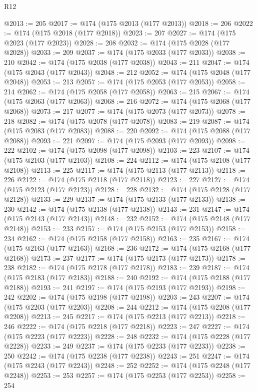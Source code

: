 \begin{lexlean}{R12}
\begin{coremodule}
@2013 := 205
@2017 := @174 (@175 @2013 (@177 @2013))
@2018 := 206
@2022 := @174 (@175 @2018 (@177 @2018))
@2023 := 207
@2027 := @174 (@175 @2023 (@177 @2023))
@2028 := 208
@2032 := @174 (@175 @2028 (@177 @2028))
@2033 := 209
@2037 := @174 (@175 @2033 (@177 @2033))
@2038 := 210
@2042 := @174 (@175 @2038 (@177 @2038))
@2043 := 211
@2047 := @174 (@175 @2043 (@177 @2043))
@2048 := 212
@2052 := @174 (@175 @2048 (@177 @2048))
@2053 := 213
@2057 := @174 (@175 @2053 (@177 @2053))
@2058 := 214
@2062 := @174 (@175 @2058 (@177 @2058))
@2063 := 215
@2067 := @174 (@175 @2063 (@177 @2063))
@2068 := 216
@2072 := @174 (@175 @2068 (@177 @2068))
@2073 := 217
@2077 := @174 (@175 @2073 (@177 @2073))
@2078 := 218
@2082 := @174 (@175 @2078 (@177 @2078))
@2083 := 219
@2087 := @174 (@175 @2083 (@177 @2083))
@2088 := 220
@2092 := @174 (@175 @2088 (@177 @2088))
@2093 := 221
@2097 := @174 (@175 @2093 (@177 @2093))
@2098 := 222
@2102 := @174 (@175 @2098 (@177 @2098))
@2103 := 223
@2107 := @174 (@175 @2103 (@177 @2103))
@2108 := 224
@2112 := @174 (@175 @2108 (@177 @2108))
@2113 := 225
@2117 := @174 (@175 @2113 (@177 @2113))
@2118 := 226
@2122 := @174 (@175 @2118 (@177 @2118))
@2123 := 227
@2127 := @174 (@175 @2123 (@177 @2123))
@2128 := 228
@2132 := @174 (@175 @2128 (@177 @2128))
@2133 := 229
@2137 := @174 (@175 @2133 (@177 @2133))
@2138 := 230
@2142 := @174 (@175 @2138 (@177 @2138))
@2143 := 231
@2147 := @174 (@175 @2143 (@177 @2143))
@2148 := 232
@2152 := @174 (@175 @2148 (@177 @2148))
@2153 := 233
@2157 := @174 (@175 @2153 (@177 @2153))
@2158 := 234
@2162 := @174 (@175 @2158 (@177 @2158))
@2163 := 235
@2167 := @174 (@175 @2163 (@177 @2163))
@2168 := 236
@2172 := @174 (@175 @2168 (@177 @2168))
@2173 := 237
@2177 := @174 (@175 @2173 (@177 @2173))
@2178 := 238
@2182 := @174 (@175 @2178 (@177 @2178))
@2183 := 239
@2187 := @174 (@175 @2183 (@177 @2183))
@2188 := 240
@2192 := @174 (@175 @2188 (@177 @2188))
@2193 := 241
@2197 := @174 (@175 @2193 (@177 @2193))
@2198 := 242
@2202 := @174 (@175 @2198 (@177 @2198))
@2203 := 243
@2207 := @174 (@175 @2203 (@177 @2203))
@2208 := 244
@2212 := @174 (@175 @2208 (@177 @2208))
@2213 := 245
@2217 := @174 (@175 @2213 (@177 @2213))
@2218 := 246
@2222 := @174 (@175 @2218 (@177 @2218))
@2223 := 247
@2227 := @174 (@175 @2223 (@177 @2223))
@2228 := 248
@2232 := @174 (@175 @2228 (@177 @2228))
@2233 := 249
@2237 := @174 (@175 @2233 (@177 @2233))
@2238 := 250
@2242 := @174 (@175 @2238 (@177 @2238))
@2243 := 251
@2247 := @174 (@175 @2243 (@177 @2243))
@2248 := 252
@2252 := @174 (@175 @2248 (@177 @2248))
@2253 := 253
@2257 := @174 (@175 @2253 (@177 @2253))
@2258 := 254

\end{coremodule}
\end{lexlean}
